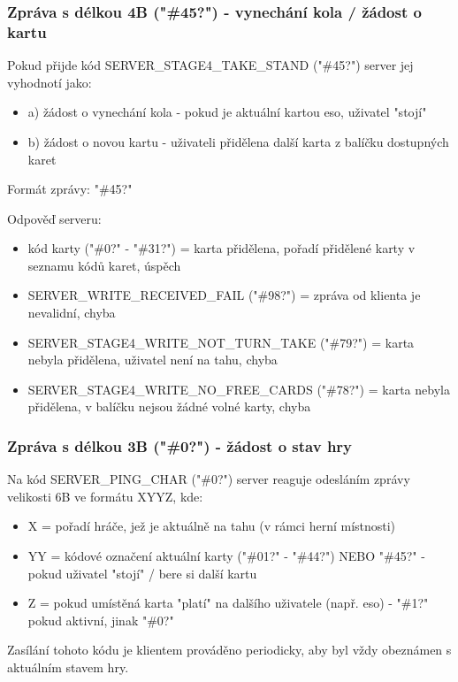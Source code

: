 \documentclass[12pt, a4paper, pdftex, czech, titlepage]{report}
\begin{document}
\subsubsection{Zpráva s délkou 4B ("\#45?") - vynechání kola / žádost o kartu}
Pokud přijde kód SERVER\_STAGE4\_TAKE\_STAND ("\#45?") server jej
vyhodnotí jako:
\begin{itemize}
\item a) žádost o vynechání kola - pokud je aktuální kartou eso, uživatel "stojí"
\item b) žádost o novou kartu - uživateli přidělena další karta z balíčku dostupných karet
\end{itemize}

Formát zprávy: "\#45?"

Odpověď serveru:
\begin{itemize}
\item kód karty ("\#0?" - "\#31?") = karta přidělena, pořadí přidělené karty v seznamu kódů karet, úspěch
\item SERVER\_WRITE\_RECEIVED\_FAIL ("\#98?") = zpráva od klienta je nevalidní, chyba
\item SERVER\_STAGE4\_WRITE\_NOT\_TURN\_TAKE ("\#79?") = karta nebyla přidělena, uživatel není na tahu, chyba
\item SERVER\_STAGE4\_WRITE\_NO\_FREE\_CARDS ("\#78?") = karta nebyla přidělena, v balíčku nejsou žádné volné karty, chyba
\end{itemize}

\subsubsection{Zpráva s délkou 3B ("\#0?") - žádost o stav hry}
Na kód SERVER\_PING\_CHAR ("\#0?") server reaguje odesláním zprávy velikosti 6B ve formátu XYYZ,
kde:

\begin{itemize}
\item X = pořadí hráče, jež je aktuálně na tahu (v rámci herní místnosti)
\item YY = kódové označení aktuální karty ("\#01?" - "\#44?") NEBO "\#45?" - pokud uživatel "stojí" / bere si další kartu
\item Z = pokud umístěná karta "platí" na dalšího uživatele (např. eso) - "\#1?" pokud aktivní, jinak "\#0?"
\end{itemize}

Zasílání tohoto kódu je klientem prováděno periodicky, aby byl vždy obeznámen s aktuálním stavem hry.
\end{document}
